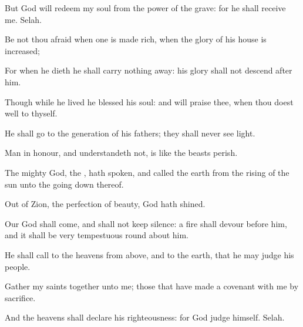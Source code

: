 {\Q {}But
God will
redeem my
soul from the
power of the
grave: for he shall
receive me.
Selah.


\par }{\Q {}Be not thou
afraid when
one is made
rich, when the
glory of his
house is
increased;


\par }{\Q {}For when he
dieth he shall carry nothing
away: his
glory shall not
descend
after him.


\par }{\Q {}Though while he
lived he
blessed his
soul: and
{} will
praise thee, when thou doest
well to thyself.


\par }{\Q {}He shall
go to the
generation of his
fathers; they shall
never
see
light.


\par }{\Q {}Man
{} in
honour, and
understandeth not, is
like the
beasts
{}
perish.




\par }
{\Q {}The
mighty
God,
{} the
{}, hath
spoken, and
called the
earth from the
rising of the
sun unto the going
down thereof.


\par }{\Q {}Out of
Zion, the
perfection of
beauty,
God hath
shined.


\par }{\Q {}Our
God shall
come, and shall not keep
silence: a
fire shall
devour
before him, and it shall be
very
tempestuous round
about him.


\par }{\Q {}He shall
call to the
heavens from
above, and to the
earth, that he may
judge his
people.


\par }{\Q {}Gather my
saints together unto me; those that have
made a
covenant with me by
sacrifice.


\par }{\Q {}And the
heavens shall
declare his
righteousness: for
God
{}
judge himself.
Selah.


\par }{\BB \par }
